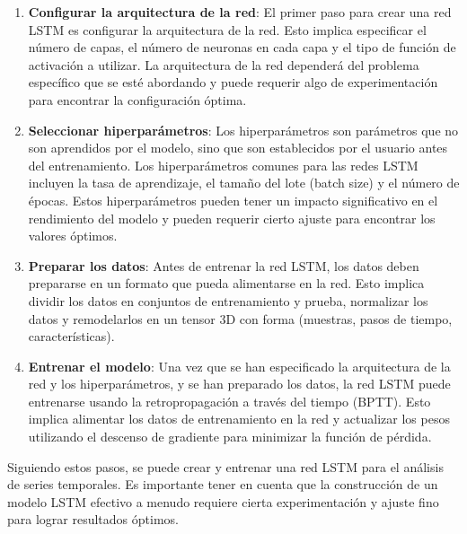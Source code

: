 \documentclass[11pt]{article}
\begin{document}
\begin{enumerate}
\item \textbf{\textbf{Configurar la arquitectura de la red}}: El primer paso para crear
una red LSTM es configurar la arquitectura de la red. Esto implica
especificar el número de capas, el número de neuronas en cada capa
y el tipo de función de activación a utilizar. La arquitectura de
la red dependerá del problema específico que se esté abordando y
puede requerir algo de experimentación para encontrar la
configuración óptima.

\item \textbf{\textbf{Seleccionar hiperparámetros}}: Los hiperparámetros son parámetros
que no son aprendidos por el modelo, sino que son establecidos por
el usuario antes del entrenamiento. Los hiperparámetros comunes
para las redes LSTM incluyen la tasa de aprendizaje, el tamaño del
lote (batch size) y el número de épocas. Estos hiperparámetros
pueden tener un impacto significativo en el rendimiento del modelo
y pueden requerir cierto ajuste para encontrar los valores óptimos.

\item \textbf{\textbf{Preparar los datos}}: Antes de entrenar la red LSTM, los datos
deben prepararse en un formato que pueda alimentarse en la
red. Esto implica dividir los datos en conjuntos de entrenamiento y
prueba, normalizar los datos y remodelarlos en un tensor 3D con
forma (muestras, pasos de tiempo, características).

\item \textbf{\textbf{Entrenar el modelo}}: Una vez que se han especificado la
arquitectura de la red y los hiperparámetros, y se han preparado
los datos, la red LSTM puede entrenarse usando la retropropagación
a través del tiempo (BPTT). Esto implica alimentar los datos de
entrenamiento en la red y actualizar los pesos utilizando el
descenso de gradiente para minimizar la función de pérdida.
\end{enumerate}

Siguiendo estos pasos, se puede crear y entrenar una red LSTM para el
análisis de series temporales. Es importante tener en cuenta que la
construcción de un modelo LSTM efectivo a menudo requiere cierta
experimentación y ajuste fino para lograr resultados óptimos.
\end{document}
